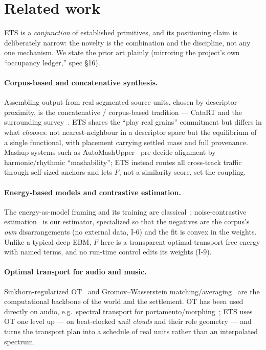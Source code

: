 \documentclass[11pt]{article}
\begin{document}
\section{Related work}

ETS is a \emph{conjunction} of established primitives, and its positioning claim is
deliberately narrow: the novelty is the combination and the discipline, not any one
mechanism. We state the prior art plainly (mirroring the project's own
``occupancy ledger,'' spec \S16).

\paragraph{Corpus-based and concatenative synthesis.} Assembling output from real
segmented source units, chosen by descriptor proximity, is the concatenative /
corpus-based tradition --- CataRT and the surrounding
survey~\cite{schwarz2006catart,schwarz2007corpus}. ETS shares the ``play real
grains'' commitment but differs in what \emph{chooses}: not nearest-neighbour in a
descriptor space but the equilibrium of a single functional, with placement
carrying settled mass and full provenance. Mashup systems such as
AutoMashUpper~\cite{davies2014automashupper} pre-decide alignment by
harmonic/rhythmic ``mashability''; ETS instead routes all cross-track traffic
through self-sized anchors and lets $F$, not a similarity score, set the coupling.

\paragraph{Energy-based models and contrastive estimation.} The energy-as-model
framing and its training are classical~\cite{lecun2006tutorial,du2019implicit};
noise-contrastive estimation~\cite{gutmann2010nce} is our estimator, specialized so
that the negatives are the corpus's \emph{own} disarrangements (no external data,
I-6) and the fit is convex in the weights. Unlike a typical deep EBM, $F$ here is a
transparent optimal-transport free energy with named terms, and no run-time control
edits its weights (I-9).

\paragraph{Optimal transport for audio and music.} Sinkhorn-regularized
OT~\cite{cuturi2013sinkhorn,peyre2019cot} and Gromov--Wasserstein
matching/averaging~\cite{memoli2011gw,peyre2016gw} are the computational backbone of
the world and the settlement. OT has been used directly on audio, e.g.\ spectral
transport for portamento/morphing~\cite{henderson2019audiotransport}; ETS uses OT
one level up --- on beat-clocked \emph{unit clouds} and their role geometry --- and
turns the transport plan into a schedule of real units rather than an interpolated
spectrum.
\end{document}
